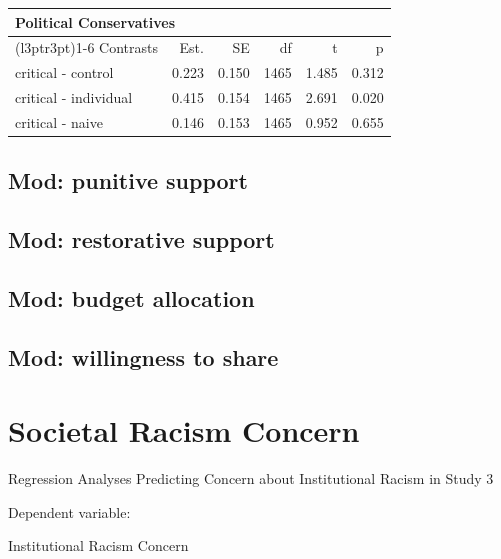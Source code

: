 \documentclass[
]{book}
\begin{document}
\begin{table}
\centering
\fontsize{13}{15}\selectfont
\begin{tabular}{lrrrrr}
\toprule
\multicolumn{6}{l}{Political Conservatives} \\
\cmidrule(l{3pt}r{3pt}){1-6}
Contrasts & Est. & SE & df & t & p\\
\midrule
critical - control & 0.223 & 0.150 & 1465 & 1.485 & 0.312\\
critical - individual & 0.415 & 0.154 & 1465 & 2.691 & 0.020\\
critical - naive & 0.146 & 0.153 & 1465 & 0.952 & 0.655\\
\bottomrule
\end{tabular}
\end{table}

\hypertarget{mod-punitive-support}{%
\subsection{Mod: punitive support}\label{mod-punitive-support}}

\hypertarget{mod-restorative-support}{%
\subsection{Mod: restorative support}\label{mod-restorative-support}}

\hypertarget{mod-budget-allocation}{%
\subsection{Mod: budget allocation}\label{mod-budget-allocation}}

\hypertarget{mod-willingness-to-share}{%
\subsection{Mod: willingness to share}\label{mod-willingness-to-share}}

\hypertarget{societal-racism-concern}{%
\section{Societal Racism Concern}\label{societal-racism-concern}}

Regression Analyses Predicting Concern about Institutional Racism in Study 3

Dependent variable:

Institutional Racism Concern
\end{document}
